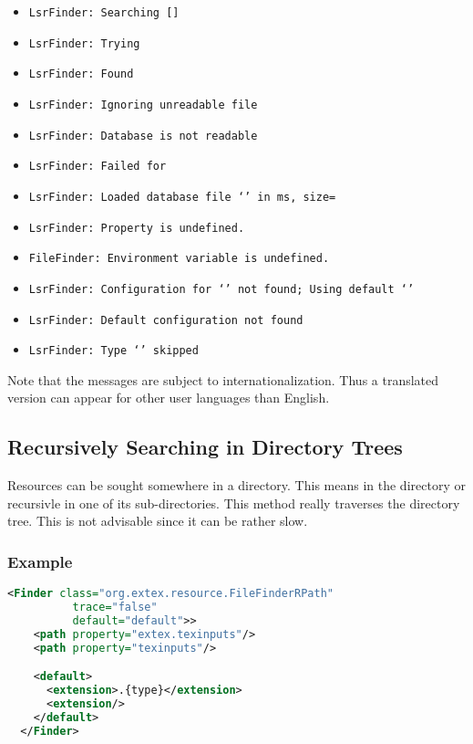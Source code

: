 {\small
\begin{itemize}
\item{\tt LsrFinder: Searching  []}
\item{\tt LsrFinder: Trying }
\item{\tt LsrFinder: Found }
\item{\tt LsrFinder: Ignoring unreadable file }
\item{\tt LsrFinder: Database  is not readable}
\item{\tt LsrFinder: Failed for }
\item{\tt LsrFinder: Loaded database file `' in  ms, size=}
\item{\tt LsrFinder: Property  is undefined.}
\item{\tt FileFinder: Environment variable  is undefined.}
\item{\tt LsrFinder: Configuration for `' not found;
    Using default `'}
\item{\tt LsrFinder: Default configuration not found}
\item{\tt LsrFinder: Type `' skipped}
\end{itemize}}

Note that the messages are subject to internationalization. Thus a
translated version can appear for other user languages than English.


\subsection{Recursively Searching in Directory Trees}

Resources can be sought somewhere in a directory. This means in the
directory or recursivle in one of its sub-directories. This method
really traverses the directory tree. This is not advisable since it
can be rather slow.

\subsubsection*{Example}

\begin{lstlisting}[language=XML]
  <Finder class="org.extex.resource.FileFinderRPath"
          trace="false"
          default="default">>
    <path property="extex.texinputs"/>
    <path property="texinputs"/>

    <default>
      <extension>.{type}</extension>
      <extension/>
    </default>
  </Finder>
\end{lstlisting}


